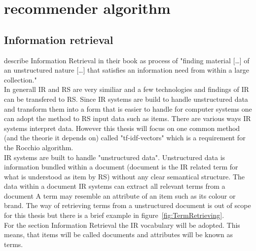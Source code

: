 
\section{recommender algorithm}


\subsection{Information retrieval}
\iffalse
Was ist Information retrieval
in depth implementation is out of scope
Hinleitung zu Vektoren
\fi
\citeauthor{manning:2009} describe Information Retrieval in their book as process of "finding material [\dots] of an unstructured nature [\dots] that satisfies an information need from within a large collection."\citep[p.~1]{manning:2009}\\
In generall IR and RS are very similiar and a few technologies and findings of IR can be transfered to RS.
Since IR systems are build to handle unstructured data and transform them into a form that is easier to handle for computer systems one can adopt the method to RS input data such as items.\citep[p.~21-23]{ricci:2011}
There are various ways IR systems interpret data.
However this thesis will focus on one common method (and the theorie it depends on) called "tf-idf-vectors" which is a requirement for the Rocchio algorithm.\citep[p.~93]{lops:2011}\\
IR systems are built to handle "unstructured data".
Unstructured data is information bundled within a document (document is the IR related term for what is understood as item by RS) without any clear semantical structure.\citep[p.~1-3]{manning:2009}
The data within a document
IR systems can extract all relevant terms from a document
A term may resemble an attribute of an item such as its colour or brand.
The way of retrieving terms from a unstructured document is out of scope for this thesis but there is a brief example in figure~\ref{fig:TermRetrieving}.\\
For the section Information Retrieval the IR vocabulary will be adopted.
This means, that items will be called documents and attributes will be known as terms.

